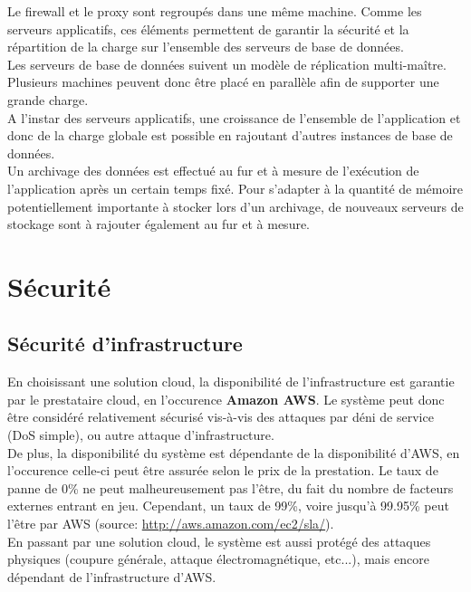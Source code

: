 Le firewall et le proxy sont regroupés dans une même machine. Comme les
serveurs applicatifs, ces éléments permettent de garantir la sécurité et la
répartition de la charge sur l'ensemble des serveurs de base de données. \\

Les serveurs de base de données suivent un modèle de réplication multi-maître.
Plusieurs machines peuvent donc être placé en parallèle afin de supporter une
grande charge. \\

A l'instar des serveurs applicatifs, une croissance de l'ensemble de
l'application et donc de la charge globale est possible en rajoutant d'autres
instances de base de données. \\

Un archivage des données est effectué au fur et à mesure de l'exécution de
l'application après un certain temps fixé. Pour s'adapter à la quantité de
mémoire potentiellement importante à stocker lors d'un archivage, de nouveaux
serveurs de stockage sont à rajouter également au fur et à mesure. \\

\section{Sécurité}
\label{sec:securite}

\subsection{Sécurité d'infrastructure}
\label{subsec:securite-infrastructure}

En choisissant une solution cloud, la disponibilité de l'infrastructure est
garantie par le prestataire cloud, en l'occurence \textbf{Amazon AWS}. Le
système peut donc être considéré relativement sécurisé vis-à-vis des attaques
par déni de service (DoS simple), ou autre attaque d'infrastructure. \\

De plus, la disponibilité du système est dépendante de la disponibilité d'AWS,
en l'occurence celle-ci peut être assurée selon le prix de la prestation. Le
taux de panne de 0\% ne peut malheureusement pas l'être, du fait du nombre de
facteurs externes entrant en jeu. Cependant, un taux de 99\%, voire jusqu'à
99.95\% peut l'être par AWS (source: \url{http://aws.amazon.com/ec2/sla/}). \\

En passant par une solution cloud, le système est aussi protégé des attaques
physiques (coupure générale, attaque électromagnétique, etc...), mais encore
dépendant de l'infrastructure d'AWS. \\

